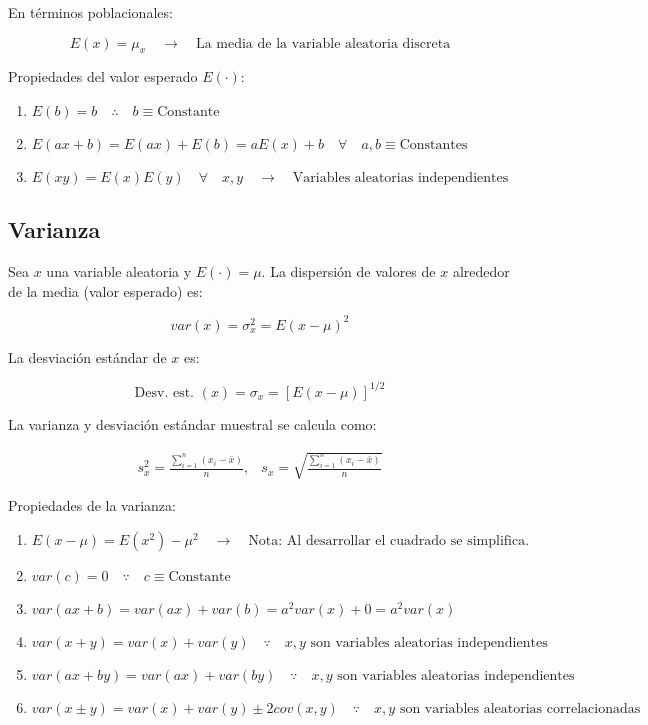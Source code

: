 \documentclass[
]{book}
\providecommand{\tightlist}{%
  \setlength{\itemsep}{0pt}\setlength{\parskip}{0pt}}
\begin{document}
En términos poblacionales:

\[
E(x) = \mu_x \quad \rightarrow \quad \text{La media de la variable aleatoria discreta}
\]

Propiedades del valor esperado \(E(\cdot)\):

\begin{enumerate}
\def\labelenumi{\arabic{enumi}.}
\tightlist
\item
  \(E(b) = b \quad \therefore \quad b \equiv \text{Constante}\)
\item
  \(E(ax + b) = E(ax) + E(b) = aE(x) + b \quad \forall \quad a,b\equiv \text{Constantes}\)
\item
  \(E(xy) = E(x)E(y) \quad \forall \quad x,y \quad \rightarrow \quad \text{Variables aleatorias independientes}\)
\end{enumerate}

\hypertarget{varianza}{%
\subsection{Varianza}\label{varianza}}

Sea \(x\) una variable aleatoria y \(E(\cdot) = \mu\). La dispersión de valores de \(x\) alrededor de la media (valor esperado) es:

\[
var(x) = \sigma_x^2 = E(x-\mu)^2
\]

La desviación estándar de \(x\) es:

\[
\text{Desv. est. }(x) = \sigma_x = [E(x-\mu)]^{1/2}
\]

La varianza y desviación estándar muestral se calcula como:

\[
\begin{array}{cc}
s_x^2 = \frac{\sum_{i=1}^n (x_i - \bar x)}{n}, & s_x = \sqrt{\frac{\sum_{i=1}^n (x_i - \bar x)}{n}}
\end{array}
\]

Propiedades de la varianza:

\begin{enumerate}
\def\labelenumi{\arabic{enumi}.}
\tightlist
\item
  \(E(x-\mu) = E(x^2) - \mu^2 \quad \rightarrow \quad \text{Nota: Al desarrollar el cuadrado se simplifica.}\)
\item
  \(var(c)=0 \quad \because \quad c \equiv \text{Constante}\)
\item
  \(var(ax + b) = var(ax) + var(b) = a^2 var(x) + 0 = a^2 var(x)\)
\item
  \(var(x+y) = var(x) + var(y) \quad \because \quad x,y \text{ son variables aleatorias independientes}\)
\item
  \(var(ax + by) = var(ax) + var(by) \quad \because \quad x,y \text{ son variables aleatorias independientes}\)
\item
  \(var(x \pm y) = var(x) + var(y) \pm 2cov(x,y) \quad \because \quad x,y \text{ son variables aleatorias correlacionadas}\)
\end{enumerate}
\end{document}
